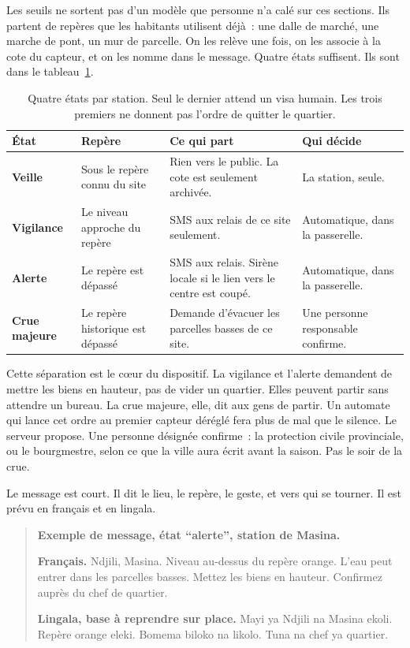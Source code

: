 \documentclass[12pt,a4paper]{article}
\begin{document}
Les seuils ne sortent pas d'un modèle que personne n'a calé sur ces sections. Ils partent de repères que les habitants utilisent déjà~: une dalle de marché, une marche de pont, un mur de parcelle. On les relève une fois, on les associe à la cote du capteur, et on les nomme dans le message. Quatre états suffisent. Ils sont dans le tableau~\ref{tab:etats}.

\begin{table}[ht]
\centering
\small
\renewcommand{\arraystretch}{1.28}
\begin{tabularx}{\textwidth}{@{}>{\raggedright\arraybackslash\bfseries}p{2.15cm}>{\raggedright\arraybackslash}X>{\raggedright\arraybackslash}X>{\raggedright\arraybackslash}X@{}}
\toprule
État & Repère & Ce qui part & Qui décide \\
\midrule
Veille & Sous le repère connu du site & Rien vers le public. La cote est seulement archivée. & La station, seule. \\
\addlinespace
Vigilance & Le niveau approche du repère & SMS aux relais de ce site seulement. & Automatique, dans la passerelle. \\
\addlinespace
Alerte & Le repère est dépassé & SMS aux relais. Sirène locale si le lien vers le centre est coupé. & Automatique, dans la passerelle. \\
\addlinespace
Crue majeure & Le repère historique est dépassé & Demande d'évacuer les parcelles basses de ce site. & Une personne responsable confirme. \\
\bottomrule
\end{tabularx}
\caption{Quatre états par station. Seul le dernier attend un visa humain. Les trois premiers ne donnent pas l'ordre de quitter le quartier.}
\label{tab:etats}
\end{table}

Cette séparation est le cœur du dispositif. La vigilance et l'alerte demandent de mettre les biens en hauteur, pas de vider un quartier. Elles peuvent partir sans attendre un bureau. La crue majeure, elle, dit aux gens de partir. Un automate qui lance cet ordre au premier capteur déréglé fera plus de mal que le silence. Le serveur propose. Une personne désignée confirme~: la protection civile provinciale, ou le bourgmestre, selon ce que la ville aura écrit avant la saison. Pas le soir de la crue.

Le message est court. Il dit le lieu, le repère, le geste, et vers qui se tourner. Il est prévu en français et en lingala.

\begin{quote}
\textbf{Exemple de message, état \enquote{alerte}, station de Masina.}

\textbf{Français.} Ndjili, Masina. Niveau au-dessus du repère orange. L'eau peut entrer dans les parcelles basses. Mettez les biens en hauteur. Confirmez auprès du chef de quartier.

\vspace{0.45em}
\textbf{Lingala, base à reprendre sur place.} Mayi ya Ndjili na Masina ekoli. Repère orange eleki. Bomema biloko na likolo. Tuna na chef ya quartier.
\end{quote}
\end{document}
